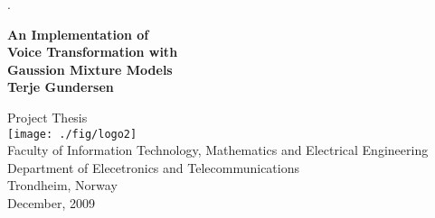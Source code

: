\begin{titlepage}
 
\begin{center}
 
\color{white} .\\[1cm]
\color{black}

{ \huge \textbf{An Implementation of \\[0.2cm] Voice Transformation with \\[0.5cm] Gaussion Mixture Models}}\\[3.5cm]
 
{\LARGE \bf Terje Gundersen}
 
\vfill

\large Project Thesis \\[2cm]

\texttt{[image: ./fig/logo2]}\\[0.5cm]
 
\large Faculty of Information Technology, Mathematics and Electrical Engineering \\
Department of Elecetronics and Telecommunications\\
Trondheim, Norway\\[0.5cm]


December, 2009
 
\end{center}
 
\end{titlepage}
